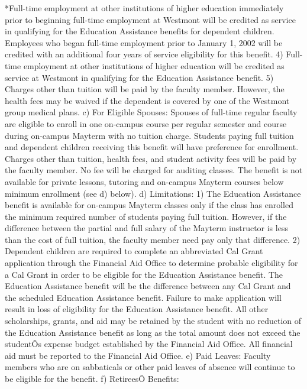 \documentclass[letterpaper, 11pt]{article}
\begin{document}
	*Full-time employment at other institutions of higher education immediately prior to beginning full-time employment at Westmont will be credited as service in qualifying for the Education Assistance benefits for dependent children.  Employees who began full-time employment prior to January 1, 2002 will be credited with an additional four years of service eligibility for this benefit.
	4) Full-time employment at other institutions of higher education will be credited as service at Westmont in qualifying for the Education Assistance benefit.
	5) Charges other than tuition will be paid by the faculty member.  However, the health fees may be waived if the dependent is covered by one of the Westmont group medical plans.
	c) For Eligible Spouses:
	Spouses of full-time regular faculty are eligible to enroll in one on-campus course per regular semester and course during on-campus Mayterm with no tuition charge.  Students paying full tuition and dependent children receiving this benefit will have preference for enrollment.  Charges other than tuition, health fees, and student activity fees will be paid by the faculty member.  No fee will be charged for auditing classes.  The benefit is not available for private lessons, tutoring and on-campus Mayterm courses below minimum enrollment (see d) below).
	d) Limitations:
	1) The Education Assistance benefit is available for on-campus Mayterm classes only if the class has enrolled the minimum required number of students paying full tuition.  However, if the difference between the partial and full salary of the Mayterm instructor is less than the cost of full tuition, the faculty member need pay only that difference.
	2) Dependent children are required to complete an abbreviated Cal Grant application through the Financial Aid Office to determine probable eligibility for a Cal Grant in order to be eligible for the Education Assistance benefit.  The Education Assistance benefit will be the difference between any Cal Grant and the scheduled Education Assistance benefit.  Failure to make application will result in loss of eligibility for the Education Assistance benefit.  All other scholarships, grants, and aid may be retained by the student with no reduction of the Education Assistance benefit as long as the total amount does not exceed the studentÕs expense budget established by the Financial Aid Office.  All financial aid must be reported to the Financial Aid Office.
	e) Paid Leaves:
	Faculty members who are on sabbaticals or other paid leaves of absence will continue to be eligible for the benefit.
	f) RetireesÕ Benefits:
\end{document}

